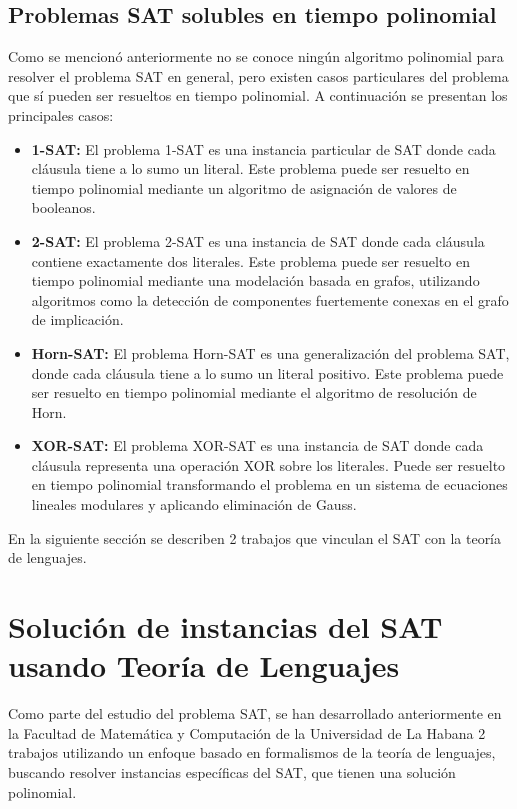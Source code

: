 \subsection{Problemas SAT solubles en tiempo polinomial}

Como se mencionó anteriormente no se conoce ningún algoritmo polinomial para resolver el problema SAT en general, pero
existen casos particulares del problema que sí pueden ser resueltos en tiempo polinomial. A continuación se presentan los
principales casos:

\begin{itemize}
  \item \textbf{1-SAT:} El problema 1-SAT es una instancia particular de SAT donde cada cláusula tiene a lo sumo un literal.
        Este problema puede ser resuelto en tiempo polinomial mediante un algoritmo de asignación de valores de booleanos.
        
  \item \textbf{2-SAT:} El problema 2-SAT es una instancia de SAT donde cada cláusula contiene exactamente dos literales.
        Este problema puede ser resuelto en tiempo polinomial mediante una modelación basada en grafos, 
        utilizando algoritmos como la detección de componentes fuertemente conexas en el grafo de implicación.
        
  \item \textbf{Horn-SAT:} El problema Horn-SAT es una generalización del problema SAT,
        donde cada cláusula tiene a lo sumo un literal positivo. 
        Este problema puede ser resuelto en tiempo polinomial mediante el algoritmo de resolución de Horn.
        
  \item \textbf{XOR-SAT:} El problema XOR-SAT es una instancia de SAT donde cada cláusula representa una operación XOR
        sobre los literales. Puede ser resuelto en tiempo polinomial transformando el problema en un sistema de ecuaciones 
        lineales modulares y aplicando eliminación de Gauss.
\end{itemize}

En la siguiente sección se describen 2 trabajos que vinculan el SAT con la teoría de lenguajes.

\section{Solución de instancias del SAT usando Teoría de Lenguajes}

Como parte del estudio del problema SAT, se han desarrollado anteriormente en 
la Facultad de Matemática y Computación de la Universidad de La Habana 
2 trabajos utilizando un enfoque 
basado en formalismos de la teoría de lenguajes, buscando resolver 
instancias específicas del SAT, que tienen una solución polinomial. 

